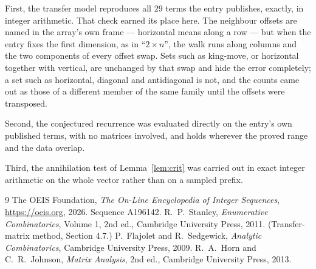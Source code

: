 \documentclass[11pt,a4paper]{article}
\theoremstyle{plain}
\theoremstyle{definition}
\begin{document}
First, the transfer model reproduces all $29$ terms the entry publishes, exactly, in
integer arithmetic. That check earned its place here. The neighbour offsets are named in the
array's own frame --- horizontal means along a row --- but when the entry fixes the first
dimension, as in ``$2\times n$'', the walk runs along columns and the two components of every
offset swap. Sets such as king-move, or horizontal together with vertical, are unchanged by
that swap and hide the error completely; a set such as horizontal, diagonal and antidiagonal
is not, and the counts came out as those of a different member of the same family until the
offsets were transposed.

Second, the conjectured recurrence was evaluated directly on the entry's own published terms,
with no matrices involved, and holds wherever the proved range and the data overlap.

Third, the annihilation test of Lemma~\ref{lem:crit} was carried out in exact integer
arithmetic on the whole vector rather than on a sampled prefix.

\begin{thebibliography}{9}
 The OEIS Foundation, \emph{The On-Line Encyclopedia of Integer
Sequences}, \url{https://oeis.org}, 2026. Sequence A196142.
 R.~P.~Stanley, \emph{Enumerative Combinatorics}, Volume 1, 2nd ed.,
Cambridge University Press, 2011. (Transfer-matrix method, Section 4.7.)
 P.~Flajolet and R.~Sedgewick, \emph{Analytic Combinatorics}, Cambridge
University Press, 2009.
 R.~A.~Horn and C.~R.~Johnson, \emph{Matrix Analysis}, 2nd ed., Cambridge
University Press, 2013.
\end{thebibliography}
\end{document}
